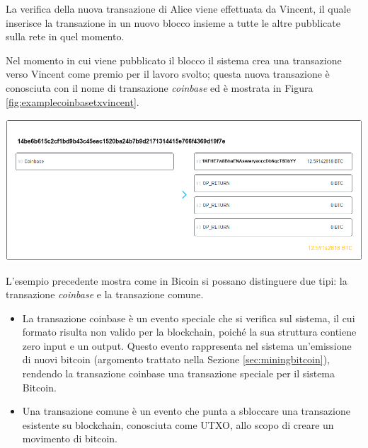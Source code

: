 \begin{example}
La verifica della nuova transazione di Alice viene effettuata da Vincent, il quale inserisce la transazione in un nuovo blocco insieme a tutte le altre pubblicate sulla rete in quel momento.

Nel momento in cui viene pubblicato il blocco il sistema crea una transazione verso Vincent come premio per il lavoro svolto; questa nuova transazione è conosciuta con il nome di transazione \emph{coinbase} ed è mostrata in Figura \ref{fig:examplecoinbasetxvincent}.

{\centering
\vspace{15pt}
\includegraphics[scale=0.35]{images/example_coinbase_vincent.png}
\vspace{10pt}
\par}

\end{example}

L'esempio precedente mostra come  in Bicoin si possano distinguere due tipi: la transazione {\it coinbase\/} e la transazione comune.
\begin{itemize}
  \item La transazione coinbase è un evento speciale che si verifica sul sistema, il cui formato risulta non valido per la blockchain, poiché la sua struttura contiene zero input e un output. Questo evento rappresenta nel sistema un’emissione di nuovi bitcoin (argomento trattato nella Sezione \ref{sec:miningbitcoin}), rendendo la transazione coinbase una transazione speciale per il sistema Bitcoin.
  \item Una transazione comune è un evento che punta a sbloccare una transazione esistente su blockchain, conosciuta come UTXO, allo scopo di   creare un movimento di bitcoin.
\end{itemize}

